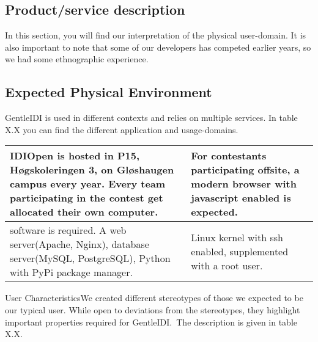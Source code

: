 \subsection{Product/service description}
In this section, you will find our interpretation of the physical
user-domain. It is also important to note that some of our developers
has competed earlier years, so we had some ethnographic experience.

\subsection{Expected Physical Environment}
GentleIDI is used in different contexts and relies on multiple services.
In table X.X you can find the different application and usage-domains.

\begin{tabular}{|m{3.1712599in}|m{3.1712599in}|}
\hline
IDIOpen is hosted in P15, Høgskoleringen 3, on
Gløshaugen campus every year. Every team participating in the
contest get allocated their own computer. &
For contestants participating offsite, a modern
browser with javascript enabled is expected.\\
\hline
software is required. A web server(Apache, Nginx), database
server(MySQL, PostgreSQL), Python with PyPi package manager.
 &
Linux kernel with ssh enabled, supplemented with a root user.
\\\hline
\end{tabular}

User CharacteristicsWe created different stereotypes of those we expected to be our typical
user. While open to deviations from the stereotypes, they highlight
important properties required for GentleIDI.\ The description is given
in table X.X.

